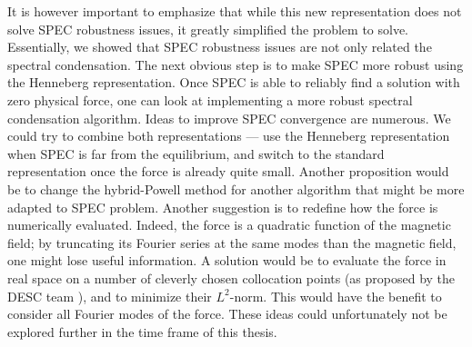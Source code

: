 \documentclass[my_thesis.tex]{subfiles}
\begin{document}
It is however important to emphasize that while this new representation does not solve SPEC robustness issues, it greatly simplified the problem to solve. Essentially, we showed that SPEC robustness issues are not only related the spectral condensation. The next obvious step is to make SPEC more robust using the Henneberg representation. Once SPEC is able to reliably find a solution with zero physical force, one can look at implementing a more robust spectral condensation algorithm. Ideas to improve SPEC convergence are numerous. We could try to combine both representations --- use the Henneberg representation when SPEC is far from the equilibrium, and switch to the standard representation once the force is already quite small. Another proposition would be to change the hybrid-Powell method for another algorithm that might be more adapted to SPEC problem. Another suggestion is to redefine how the force is numerically evaluated. Indeed, the force is a quadratic function of the magnetic field; by truncating its Fourier series at the same modes than the magnetic field, one might lose useful information. A solution would be to evaluate the force in real space on a number of cleverly chosen collocation points (as proposed by the DESC team \citep{Dudt2020}), and to minimize their $L^2$-norm. This would have the benefit to consider all Fourier modes of the force. These ideas could unfortunately not be explored further in the time frame of this thesis.




\end{document}
